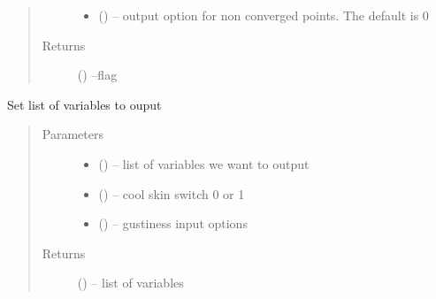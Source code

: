 \documentclass[letterpaper,10pt,english]{sphinxmanual}
\begin{document}
\begin{fulllineitems}
\begin{quote}
\begin{description}
\begin{itemize}
\item{}
 (\href{https://docs.python.org/3/library/functions.html\#int}{}) -- output option for non converged points. The default is 0
\end{itemize}

\item[{Returns}] \leavevmode
{} (\href{https://docs.python.org/3/library/functions.html\#str}{}) --flag


\end{description}\end{quote}

\end{fulllineitems}


\begin{fulllineitems}
\label{\detokenize{index:util_subs.get_outvars}}
Set list of variables to ouput
\begin{quote}\begin{description}
\item[{Parameters}] \leavevmode\begin{itemize}
\item{}
 (\href{https://docs.python.org/3/library/functions.html\#str}{}) -- list of variables we want to output

\item{}
 (\href{https://docs.python.org/3/library/functions.html\#int}{}) -- cool skin switch 0 or 1

\item{}
 (\href{https://docs.python.org/3/library/functions.html\#float}{}) -- gustiness input options
\end{itemize}

\item[{Returns}] \leavevmode
{} (\href{https://docs.python.org/3/library/functions.html\#str}{}) -- list of variables


\end{description}\end{quote}

\end{fulllineitems}
\end{document}
